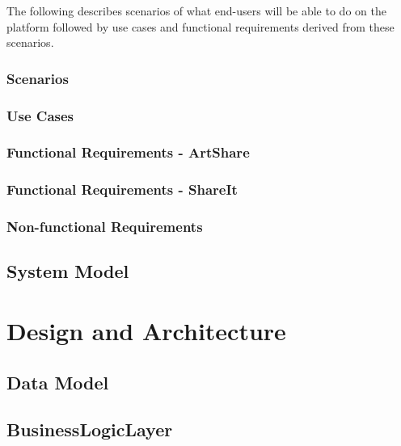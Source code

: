 \documentclass{report}
\begin{document}
The following describes scenarios of what end-users will be able to do on the platform followed by use cases and functional requirements derived from these scenarios.


\subsection{Scenarios}


\newpage
\subsection{Use Cases}
\FloatBarrier
{}



\FloatBarrier
\newpage \subsection{Functional Requirements - ArtShare}


\newpage \subsection{Functional Requirements - ShareIt}


\newpage \subsection{Non-functional Requirements}


\section{System Model}

\chapter{Design and Architecture}

\section{Data Model}



\section{BusinessLogicLayer}
\end{document}
